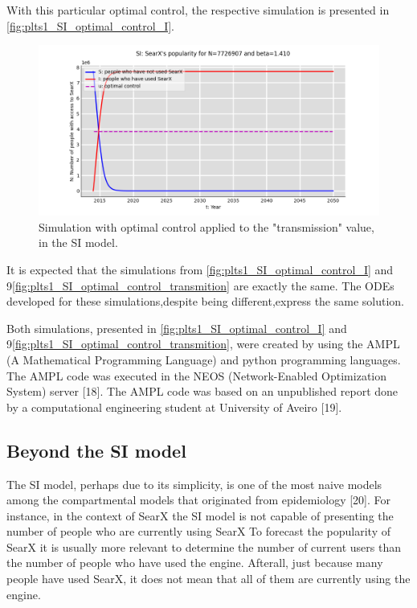 \documentclass{article}
\begin{document}

With‌ ‌this‌ ‌particular‌ ‌optimal‌ ‌control,‌ ‌the‌ ‌respective‌ ‌simulation‌ ‌is‌ ‌presented‌ ‌in‌ \autoref{fig:plts1_SI_optimal_control_I}.

\begin{figure}[h]
    \centering
    \includegraphics[width=0.8\linewidth]{plts1_SI_optimal_control_I}
    \caption{‌‌Simulation‌ ‌with‌ ‌optimal‌ ‌control‌ ‌applied‌ ‌to‌ ‌the‌ ‌"transmission"‌ ‌value,‌ ‌in‌ ‌the‌ ‌SI‌ ‌model.‌‌‌}
    \label{fig:plts1_SI_optimal_control_transmition}
\end{figure}

It‌ ‌is‌ ‌expected‌ ‌that‌ ‌the‌ ‌simulations‌ ‌from‌ \autoref{fig:plts1_SI_optimal_control_I}‌ ‌and‌ ‌9\autoref{fig:plts1_SI_optimal_control_transmition} ‌are‌ ‌exactly‌ ‌the‌ ‌same.‌ ‌The‌ ‌ODEs‌‌
developed‌‌ for‌‌ these‌‌ simulations,‌‌despite‌‌ being‌‌ different,‌‌express‌‌ the‌‌ same‌‌ solution.

Both‌ ‌simulations,‌ presented‌ ‌in‌ \autoref{fig:plts1_SI_optimal_control_I}‌ ‌and‌ ‌9\autoref{fig:plts1_SI_optimal_control_transmition},‌ ‌were‌ ‌created‌ ‌by‌ ‌using‌ ‌the‌ ‌AMPL‌  (A‌‌ Mathematical‌ ‌Programming‌ ‌Language)‌ ‌and‌ ‌python‌ ‌programming‌ ‌languages.‌ ‌The‌ ‌AMPL‌ ‌code‌‌ was‌ ‌executed‌ ‌in‌ ‌the‌ ‌NEOS‌  (Network-Enabled‌ ‌Optimization‌ ‌System)‌ ‌server‌ ‌[18].‌ ‌The‌ ‌AMPL‌‌ code‌ ‌was‌ ‌based‌ ‌on‌ ‌an‌ ‌unpublished‌ ‌report‌ ‌done‌ ‌by‌ ‌a‌ ‌computational‌ ‌engineering‌ ‌student‌ ‌at‌‌ University‌ ‌of‌ ‌Aveiro‌ ‌[19].‌

\subsection{Beyond the SI model}

The‌ ‌SI‌ ‌model,‌ ‌perhaps‌ ‌due‌ ‌to‌ ‌its‌ ‌simplicity,‌ ‌is‌ ‌one‌ ‌of‌ ‌the‌ ‌most‌ ‌naive‌ ‌models‌ ‌among‌ ‌the‌‌ compartmental‌ ‌models‌ ‌that‌ ‌originated‌ ‌from‌ ‌epidemiology‌ [20].‌ ‌For‌ ‌instance,‌ ‌in‌ ‌the‌ ‌context‌ ‌of‌‌ SearX ‌‌the‌‌ SI‌‌ model‌‌ is‌‌ not‌‌ capable‌‌ of‌‌ presenting‌‌ the‌‌ number‌‌ of‌‌ people‌‌ who‌‌ are‌‌ currently‌‌ using‌‌ SearX ‌‌To‌‌ forecast‌‌ the‌‌ popularity‌‌ of‌‌ SearX ‌‌it‌‌ is‌‌ usually‌‌ more‌‌ relevant‌‌ to‌‌ determine‌‌ the‌‌ number‌‌ of‌ ‌current‌ ‌users‌ ‌than‌ ‌the‌ ‌number‌ ‌of‌ ‌people‌ ‌who‌ ‌have‌ ‌used‌ ‌the‌ ‌engine. ‌‌Afterall,‌‌ just‌‌ because‌‌ many‌ ‌people‌ ‌have‌ ‌used‌ ‌SearX,‌ ‌it‌ does not ‌mean‌ ‌that‌ ‌all‌ ‌of‌ ‌them‌ ‌are‌ ‌currently‌ ‌using‌ ‌the‌ ‌engine.‌‌
\end{document}
